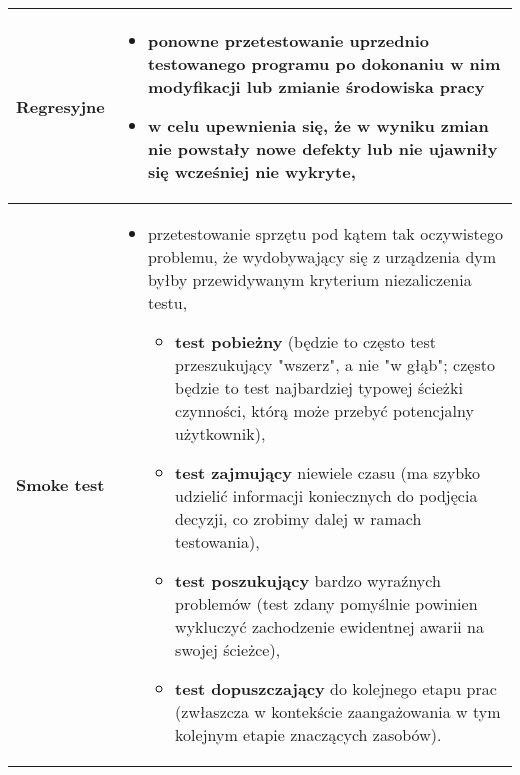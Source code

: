 \documentclass[../main.tex]{subfiles}
\begin{document}
    \begin{table}[H]
        \begin{center}
            \begin{tabular}{ p{3cm} p{13cm} }
                    \textbf{Regresyjne}
                    &
                    \begin{itemize}
                        \item ponowne przetestowanie uprzednio testowanego programu po dokonaniu w nim modyfikacji
                        lub zmianie środowiska pracy
                        \item w celu upewnienia
                        się, że w wyniku zmian nie powstały nowe defekty lub nie ujawniły się wcześniej nie wykryte,
                    \end{itemize}
                    \\

                    \toprule

                    \textbf{Smoke test}
                    &
                    \begin{itemize}
                        \item przetestowanie sprzętu pod kątem tak oczywistego problemu, że wydobywający się z urządzenia dym
                        byłby przewidywanym kryterium niezaliczenia testu,
                        \begin{itemize}
                            \item \textbf{test pobieżny} (będzie to często test przeszukujący "wszerz", a nie "w głąb"; często będzie to test najbardziej typowej ścieżki czynności, którą może przebyć potencjalny użytkownik),
                            \item \textbf{test zajmujący} niewiele czasu (ma szybko udzielić informacji koniecznych do podjęcia decyzji, co zrobimy dalej w ramach testowania),
                            \item \textbf{test poszukujący} bardzo wyraźnych problemów (test zdany pomyślnie powinien wykluczyć zachodzenie ewidentnej awarii na swojej ścieżce),
                            \item \textbf{test dopuszczający} do kolejnego etapu prac (zwłaszcza w kontekście zaangażowania w tym kolejnym etapie znaczących zasobów).
                        \end{itemize}
                    \end{itemize}
                    \\
            \end{tabular}
        \end{center}
    \end{table}
\end{document}
